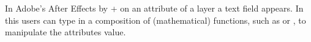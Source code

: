 \begin{example}
  In Adobe's After Effects by  +  on an attribute of a layer a text field appears. In this users can type in a composition of (mathematical) functions, such as  or , to manipulate the attributes value.
\end{example}